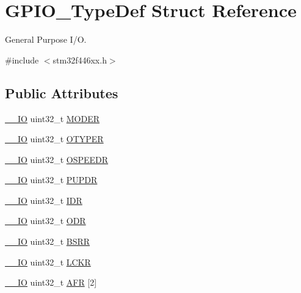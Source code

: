 \hypertarget{struct_g_p_i_o___type_def}{}\section{G\+P\+I\+O\+\_\+\+Type\+Def Struct Reference}
\label{struct_g_p_i_o___type_def}


General Purpose I/O.  




{\ttfamily \#include $<$stm32f446xx.\+h$>$}

\subsection*{Public Attributes}
\begin{DoxyCompactItemize}
\item 
\hyperlink{core__sc300_8h_aec43007d9998a0a0e01faede4133d6be}{\+\_\+\+\_\+\+IO} uint32\+\_\+t \hyperlink{struct_g_p_i_o___type_def_ac2505d096b6b650f1647b8e0ff8b196b}{M\+O\+D\+ER}
\item 
\hyperlink{core__sc300_8h_aec43007d9998a0a0e01faede4133d6be}{\+\_\+\+\_\+\+IO} uint32\+\_\+t \hyperlink{struct_g_p_i_o___type_def_a910885e4d881c3a459dd11640237107f}{O\+T\+Y\+P\+ER}
\item 
\hyperlink{core__sc300_8h_aec43007d9998a0a0e01faede4133d6be}{\+\_\+\+\_\+\+IO} uint32\+\_\+t \hyperlink{struct_g_p_i_o___type_def_a0d233d720f18ae2050f9131fa6faf7c6}{O\+S\+P\+E\+E\+DR}
\item 
\hyperlink{core__sc300_8h_aec43007d9998a0a0e01faede4133d6be}{\+\_\+\+\_\+\+IO} uint32\+\_\+t \hyperlink{struct_g_p_i_o___type_def_a44ada3bfbe891e2efc1e06bda4c8014e}{P\+U\+P\+DR}
\item 
\hyperlink{core__sc300_8h_aec43007d9998a0a0e01faede4133d6be}{\+\_\+\+\_\+\+IO} uint32\+\_\+t \hyperlink{struct_g_p_i_o___type_def_acf11156409414ad8841bb0b62959ee96}{I\+DR}
\item 
\hyperlink{core__sc300_8h_aec43007d9998a0a0e01faede4133d6be}{\+\_\+\+\_\+\+IO} uint32\+\_\+t \hyperlink{struct_g_p_i_o___type_def_a6fb78f4a978a36032cdeac93ac3c9c8b}{O\+DR}
\item 
\hyperlink{core__sc300_8h_aec43007d9998a0a0e01faede4133d6be}{\+\_\+\+\_\+\+IO} uint32\+\_\+t \hyperlink{struct_g_p_i_o___type_def_acd6f21e08912b484c030ca8b18e11cd6}{B\+S\+RR}
\item 
\hyperlink{core__sc300_8h_aec43007d9998a0a0e01faede4133d6be}{\+\_\+\+\_\+\+IO} uint32\+\_\+t \hyperlink{struct_g_p_i_o___type_def_a95a59d4b1d52be521f3246028be32f3e}{L\+C\+KR}
\item 
\hyperlink{core__sc300_8h_aec43007d9998a0a0e01faede4133d6be}{\+\_\+\+\_\+\+IO} uint32\+\_\+t \hyperlink{struct_g_p_i_o___type_def_a2245603433e102f0fd8a85f7de020755}{A\+FR} \mbox{[}2\mbox{]}
\end{DoxyCompactItemize}



